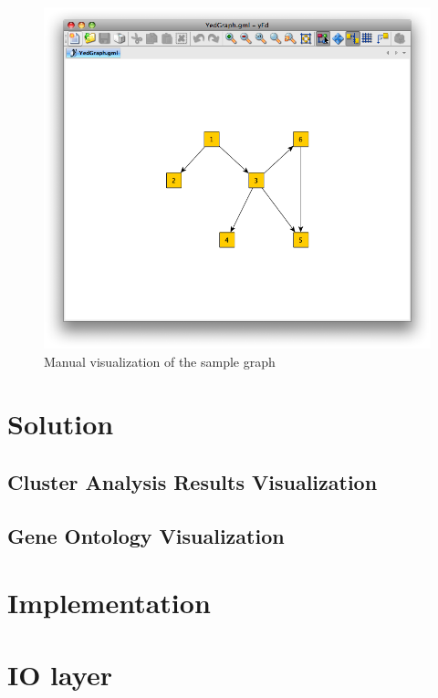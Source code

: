 \documentclass[a4paper,oneside]{article}
\begin{document}
\begin{center}
\begin{figure}
	\includegraphics[scale=0.5]{YedGraph.png}
	\caption{Manual visualization of the sample graph}
	\label{yed_graph_vis}
\end{figure}
\end{center}





\section{Solution}

\subsection{Cluster Analysis Results Visualization}

\subsection{Gene Ontology Visualization}

\section{Implementation}
\section{IO layer}
\end{document}
